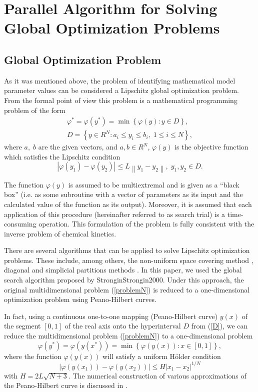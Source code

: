 \documentclass{svproc}
\begin{document}
\section{Parallel Algorithm for Solving Global Optimization Problems }\label{Sec_GSA}

\subsection{Global Optimization Problem}

As it was mentioned above, the problem of identifying mathematical model parameter values can be considered a Lipschitz global optimization problem. From the formal point of view this problem is a mathematical programming problem of the form
\begin{gather}
 \varphi^* = \varphi(y^\ast)=\min{\left\{\varphi(y):y\in D\right\}}, \label{problemN}\\
 D=\left\{y\in R^N: a_i\leq y_i \leq b_i, \;  1\leq i \leq N\right\} \label{D},
\end{gather}
where $a,\; b$ are the given vectors, and $a,b\in R^N$, $\varphi(y)$ is the objective function which satisfies the Lipschitz condition
\begin{equation}\label{Lip}
\left|\varphi(y_1)-\varphi(y_2)\right|\leq L\left\|y_1-y_2\right\|,\; y_1,y_2 \in D.
\end{equation}


The function $\varphi(y)$ is assumed to be multiextremal and is given as a ``black box'' (i.e. as some subroutine with a vector of parameters as its input and the calculated value of the function as its output). Moreover, it is assumed that each application of this procedure (hereinafter referred to as search trial) is a time-consuming operation. This formulation of the problem is fully consistent with the inverse problem of chemical kinetics.

There are several algorithms that can be applied to solve Lipschitz optimization problems. These include, among others, the non-uniform space covering method \cite{Evtushenko2013, Evtushenko2009}, diagonal and simplicial partitions methods \cite{Zilinskas2010, Paulavicius2011}. In this paper, we used the global search algorithm proposed by Strongin{Strongin2000}. Under this approach, the original multidimensional problem (\ref{problemN}) is reduced to a one-dimensional optimization problem using Peano-Hilbert curves.

In fact, using a continuous one-to-one mapping (Peano-Hilbert curve) $y(x)$ of the segment $[0,1]$ of the real axis onto the hyperinterval $D$ from (\ref{D}), we can reduce the multidimensional problem (\ref{problemN}) to a one-dimensional problem
\[
\varphi(y^\ast)=\varphi(y(x^\ast))=\min{\left\{\varphi(y(x)): x\in[0,1]\right\}},
\]
where the function $\varphi(y(x))$ will satisfy a uniform H{\"o}lder condition
\[
\left|\varphi(y(x_1))-\varphi(y(x_2))\right|\leq H\left|x_1-x_2\right|^{1/N}
\]
with $ H=2 L \sqrt{N+3}$.
The numerical construction of various approximations of the Peano-Hilbert curve is discussed in \cite{Strongin2000,Sergeyev2013}.
\end{document}
